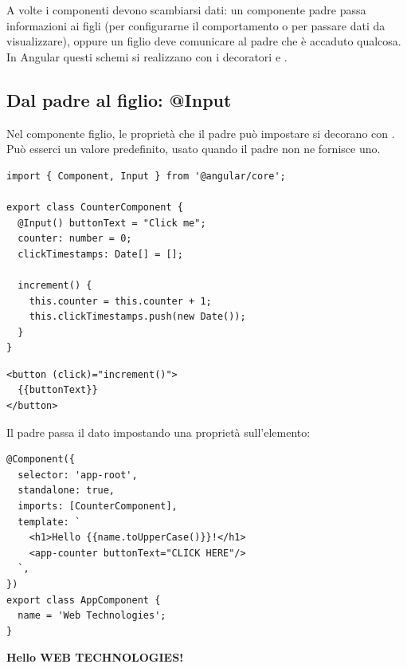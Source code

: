 A volte i componenti devono scambiarsi dati: un componente padre passa
informazioni ai figli (per configurarne il comportamento o per passare dati da
visualizzare), oppure un figlio deve comunicare al padre che è accaduto
qualcosa. In Angular questi schemi si realizzano con i decoratori
 e .

\subsection{Dal padre al figlio: @Input}

Nel componente figlio, le proprietà che il padre può impostare si decorano con
. Può esserci un valore predefinito, usato quando il padre non ne
fornisce uno.

\begin{affianco}[0.6][c]
\begin{lstlisting}[style=ts, name=counter.component.ts]
import { Component, Input } from '@angular/core';

export class CounterComponent {
  @Input() buttonText = "Click me";
  counter: number = 0;
  clickTimestamps: Date[] = [];

  increment() {
    this.counter = this.counter + 1;
    this.clickTimestamps.push(new Date());
  }
}
\end{lstlisting}
\risultato
\begin{lstlisting}[style=html, name=counter.component.html]
<button (click)="increment()">
  {{buttonText}}
</button>
\end{lstlisting}
\end{affianco}

Il padre passa il dato impostando una proprietà sull'elemento:

\begin{affianco}[0.46][c]
\begin{lstlisting}[style=ts, name=app.component.ts]
@Component({
  selector: 'app-root',
  standalone: true,
  imports: [CounterComponent],
  template: `
    <h1>Hello {{name.toUpperCase()}}!</h1>
    <app-counter buttonText="CLICK HERE"/>
  `,
})
export class AppComponent {
  name = 'Web Technologies';
}
\end{lstlisting}
\risultato
\begin{browser}[AngularApp]
  {\Lato\bfseries\LARGE\color{css-darkblue} Hello WEB TECHNOLOGIES!\par}\vspace{6pt}
\end{browser}
\end{affianco}

